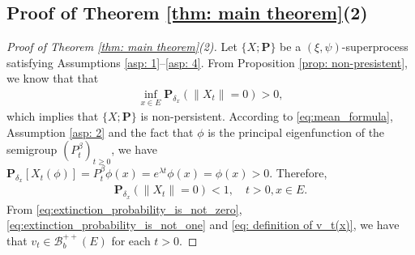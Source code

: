 \documentclass[12pt,a4paper]{amsart}
\theoremstyle{definition}
\numberwithin{equation}{section}
\begin{document}
\subsection{Proof of Theorem \ref{thm: main theorem}(2)}
\label{sec: proof of result 2}
\begin{proof}
  [Proof of Theorem \ref{thm: main theorem}(2)]
  Let $\{X; \mathbf P\}$ be a $(\xi, \psi)$-superprocess satisfying
  Assumptions \ref{asp: 1}--\ref{asp: 4}.
  From Proposition \ref{prop: non-presistent}, we know that 
that
  \begin{align}
    \label{eq:extinction_probability_is_not_zero}
   \inf_{x\in E} \mathbf P_{\delta_x}(\|X_t\| = 0)
    > 0,
  \end{align}
 which implies that $\{X; \mathbf P\}$ is non-persistent.
  According to \eqref{eq:mean_formula}, Assumption \ref{asp: 2} and the fact that $\phi$ is 
the principal eigenfunction of the semigroup $(P_t^\beta)_{t\geq 0}$, 
  we have $\mathbf P_{\delta_x}[X_t(\phi)] = P_t^\beta \phi(x) = e^{\lambda t} \phi(x)= \phi(x)>0$.
  Therefore,
  \begin{align}
    \label{eq:extinction_probability_is_not_one}
    \mathbf P_{\delta_x}(\|X_t\|= 0)<1,
    \quad t>0, x \in E.
  \end{align}
  From \eqref{eq:extinction_probability_is_not_zero}, \eqref{eq:extinction_probability_is_not_one} and \eqref{eq: definition of v_t(x)}, we have that $v_t \in \mathscr B^{++}_b(E)$ for each $t > 0$.


\end{proof}
\end{document}
